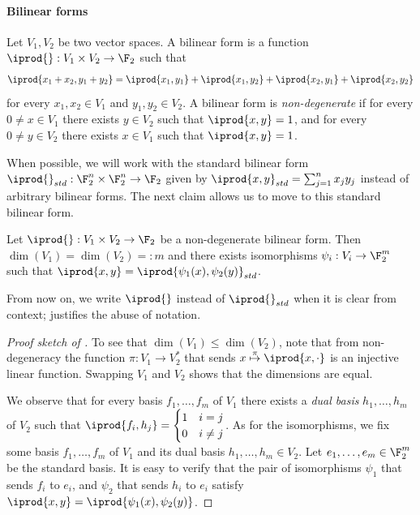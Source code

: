\paragraph{Bilinear forms}Let \(V_1,V_2\) be two vector spaces. A bilinear form is a function \(\iprod{}:V_1 \times V_2 \to \F_2\) such that \[\iprod{x_1 + x_2,y_1 + y_2} = \iprod{x_1,y_1}+\iprod{x_1,y_2}+\iprod{x_2,y_1}+\iprod{x_2,y_2}\] 
for every \(x_1,x_2 \in V_1\) and \(y_1,y_2 \in V_2\). A bilinear form is \emph{non-degenerate} if for every \(0 \ne x \in V_1\) there exists \(y \in V_2\) such that \(\iprod{x,y}=1\), and for every \(0 \ne y \in V_2\) there exists \(x \in V_1\) such that \(\iprod{x,y}=1\).

When possible, we will work with the standard bilinear form \(\iprod{}_{std}:\F_2^n \times \F_2^n \to \F_2\) given by \(\iprod{x,y}_{std} = \sum_{j=1}^n x_j y_j\) instead of arbitrary bilinear forms. The next claim allows us to move to this standard bilinear form.
\begin{claim} \label{claim:always-work-with-standard}
    Let \(\iprod{}:V_1 \times V_2 \to \F_2\) be a non-degenerate bilinear form. Then \(\dim(V_1) = \dim(V_2) =: m\) and there exists isomorphisms \(\psi_i:V_i \to \F_2^m\) such that \(\iprod{x,y} = \iprod{\psi_1(x),\psi_2(y)}_{std}\).
\end{claim}
From now on, we write \(\iprod{}\) instead of \(\iprod{}_{std}\) when it is clear from context;  justifies the abuse of notation.
\begin{proof}[Proof sketch of ]
    To see that \(\dim(V_1) \leq \dim(V_2)\), note that from non-degeneracy the function \(\pi:V_1 \to V_2^*\) that sends \(x \overset{\pi}{\mapsto} \iprod{x, \cdot}\) is an injective linear function. Swapping \(V_1\) and \(V_2\) shows that the dimensions are equal. 
    
    We observe that for every basis \(f_1,\dots,f_m\) of \(V_1\) there exists a \emph{dual basis} \(h_1,\dots,h_m\) of \(V_2\) such that \(\iprod{f_i, h_j} = \begin{cases}
        1 & i=j \\ 0 & i \ne j
    \end{cases}\).
    As for the isomorphisms, we fix some basis \(f_1,\dots,f_m\) of \(V_1\) and its dual basis \(h_1,\dots,h_m \in V_2\). Let \(e_1,\dots,e_m \in \F_2^m\) be the standard basis. It is easy to verify that the pair of isomorphisms \(\psi_1\) that sends \(f_i\) to \(e_i\), and \(\psi_2\) that sends \(h_i\) to \(e_i\) satisfy \(\iprod{x,y} = \iprod{\psi_1(x),\psi_2(y)}\).
\end{proof}

